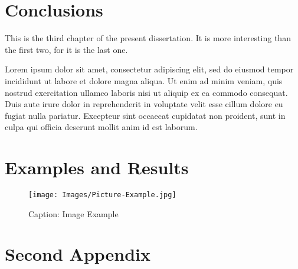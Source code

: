 \documentclass[hidelinks,pdftex,phd]{pittetd}
\begin{document}
\chapter{Conclusions}
This is the third chapter of the present dissertation.\cite{DUMMY:6} It is more interesting than the first two, for it is the last one.\cite{DUMMY:7}

Lorem ipsum dolor sit amet, consectetur adipiscing elit, sed do eiusmod tempor incididunt ut labore et dolore magna aliqua.\cite{DUMMY:8} Ut enim ad minim veniam, quis nostrud exercitation ullamco laboris nisi ut aliquip ex ea commodo consequat.\cite{DUMMY:9} Duis aute irure dolor in reprehenderit in voluptate velit esse cillum dolore eu fugiat nulla pariatur.\cite{DUMMY:10} Excepteur sint occaecat cupidatat non proident, sunt in culpa qui officia deserunt mollit anim id est laborum.



\appendix     
\chapter{Examples and Results}
\begin{figure}[t]
    \centering
    \texttt{[image: Images/Picture-Example.jpg]}
    \caption{Caption: Image Example}
    
    \label{Reference: Picture Example}
\end{figure}

\chapter{Second Appendix}




\end{document}
